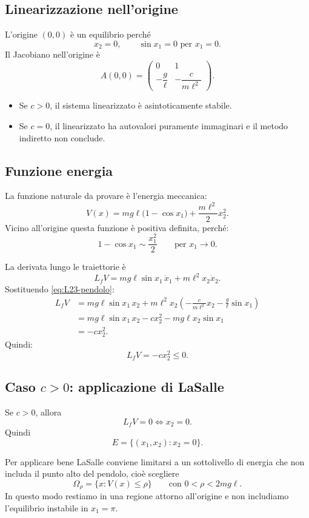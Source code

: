\subsection{Linearizzazione nell'origine}

L'origine \((0,0)\) è un equilibrio perché
\[
x_2=0, \qquad \sin x_1 = 0 \text{ per } x_1=0.
\]
Il Jacobiano nell'origine è
\[
A(0,0)=
\begin{pmatrix}
0 & 1\\[4pt]
-\dfrac{g}{\ell} & -\dfrac{c}{m\ell^2}
\end{pmatrix}.
\]

\begin{itemize}
    \item Se \(c>0\), il sistema linearizzato è asintoticamente stabile.
    \item Se \(c=0\), il linearizzato ha autovalori puramente immaginari e il metodo indiretto non conclude.
\end{itemize}

\subsection{Funzione energia}

La funzione naturale da provare è l'energia meccanica:
\[
V(x)=mg\ell\bigl(1-\cos x_1\bigr)+\frac{m\ell^2}{2}x_2^2.
\]
Vicino all'origine questa funzione è positiva definita, perché:
\[
1-\cos x_1 \sim \frac{x_1^2}{2}
\qquad \text{per } x_1\to 0.
\]

La derivata lungo le traiettorie è
\[
L_fV
=
mg\ell\sin x_1\,\dot x_1 + m\ell^2 x_2\dot x_2.
\]
Sostituendo \eqref{eq:L23-pendolo}:
\begin{align*}
L_fV
&=
mg\ell\sin x_1\,x_2
+
m\ell^2x_2\left(
-\frac{c}{m\ell^2}x_2 - \frac{g}{\ell}\sin x_1
\right)\\
&=
mg\ell\sin x_1\,x_2
-cx_2^2
-mg\ell x_2\sin x_1\\
&=
-cx_2^2.
\end{align*}
Quindi:
\[
L_fV = -cx_2^2 \le 0.
\]

\subsection{Caso \(c>0\): applicazione di LaSalle}

Se \(c>0\), allora
\[
L_fV=0 \iff x_2=0.
\]
Quindi
\[
E=\{(x_1,x_2):x_2=0\}.
\]

Per applicare bene LaSalle conviene limitarsi a un sottolivello di energia che non includa il punto alto del pendolo, cioè scegliere
\[
\Omega_\rho = \{x: V(x)\le \rho\}
\qquad \text{con } 0<\rho<2mg\ell.
\]
In questo modo restiamo in una regione attorno all'origine e non includiamo l'equilibrio instabile in \(x_1=\pi\).

